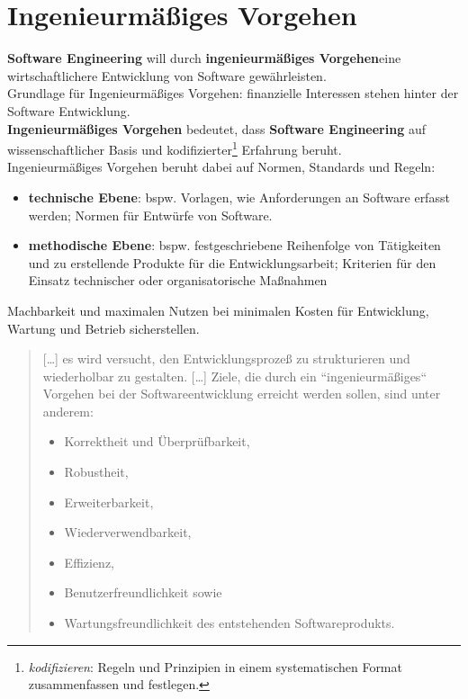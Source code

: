 \section{Ingenieurmäßiges Vorgehen}

\begin{tcolorbox}[title=Ingenieurmäßiges Vorgehen]
\textbf{Software Engineering} will durch \textbf{ingenieurmäßiges Vorgehen}eine wirtschaftlichere Entwicklung von Software gewährleisten.\\
Grundlage für Ingenieurmäßiges Vorgehen: finanzielle Interessen stehen hinter der Software Entwicklung.\\

\noindent
\textbf{Ingenieurmäßiges Vorgehen} bedeutet, dass \textbf{Software Engineering} auf wissenschaftlicher Basis und kodifizierter\footnote{
    \textit{kodifizieren}: Regeln und Prinzipien in einem systematischen Format zusammenfassen und festlegen.
} Erfahrung beruht.\\

\noindent
Ingenieurmäßiges Vorgehen beruht dabei auf Normen, Standards und Regeln:

\begin{itemize}
    \item\textbf{technische Ebene}: bspw. Vorlagen, wie Anforderungen an Software erfasst werden; Normen für Entwürfe von Software.
    \item \textbf{methodische Ebene}: bspw. festgeschriebene Reihenfolge von Tätigkeiten und zu erstellende Produkte für die Entwicklungsarbeit; Kriterien für den Einsatz technischer oder organisatorische Maßnahmen
\end{itemize}
\end{tcolorbox}


\begin{tcolorbox}[title=Ziele des Ingenieurmäßigen Vorgehens]
Machbarkeit und maximalen Nutzen bei minimalen Kosten für Entwicklung, Wartung und Betrieb sicherstellen.\\

\blockquote[{\cite[2]{SR94}}]{
[\ldots] es wird versucht, den
Entwicklungsprozeß zu strukturieren und wiederholbar zu gestalten.
[\ldots]
Ziele, die durch ein ``ingenieurmäßiges`` Vorgehen bei der Softwareentwicklung erreicht werden sollen, sind unter anderem:
\begin{itemize}
    \item Korrektheit und Überprüfbarkeit,
    \item  Robustheit,
    \item  Erweiterbarkeit,
    \item  Wiederverwendbarkeit,
    \item  Effizienz,
    \item  Benutzerfreundlichkeit sowie
    \item  Wartungsfreundlichkeit des entstehenden Softwareprodukts.
\end{itemize}
}
\end{tcolorbox}